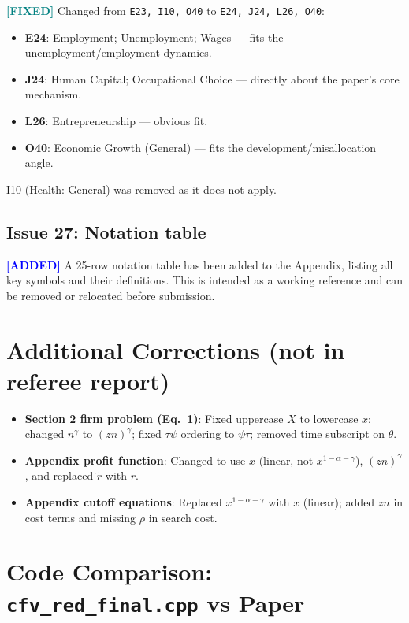 \documentclass[11pt]{article}
\newcommand{\fixed}{\textcolor{teal}{\textbf{[FIXED]}}}
\newcommand{\added}{\textcolor{blue}{\textbf{[ADDED]}}}
\begin{document}
\fixed{} Changed from \texttt{E23, I10, O40} to \texttt{E24, J24, L26, O40}:
\begin{itemize}
    \item \textbf{E24}: Employment; Unemployment; Wages --- fits the unemployment/employment dynamics.
    \item \textbf{J24}: Human Capital; Occupational Choice --- directly about the paper's core mechanism.
    \item \textbf{L26}: Entrepreneurship --- obvious fit.
    \item \textbf{O40}: Economic Growth (General) --- fits the development/misallocation angle.
\end{itemize}
I10 (Health: General) was removed as it does not apply.

\subsection*{Issue 27: Notation table}

\added{} A 25-row notation table has been added to the Appendix, listing all key symbols and their definitions. This is intended as a working reference and can be removed or relocated before submission.

\section*{Additional Corrections (not in referee report)}

\begin{itemize}
    \item \textbf{Section 2 firm problem (Eq.~1)}: Fixed uppercase $X$ to lowercase $x$; changed $n^\gamma$ to $(zn)^\gamma$; fixed $\tau\psi$ ordering to $\psi\tau$; removed time subscript on $\theta$.
    \item \textbf{Appendix profit function}: Changed to use $x$ (linear, not $x^{1-\alpha-\gamma}$), $(zn)^\gamma$, and replaced $\tilde{r}$ with $r$.
    \item \textbf{Appendix cutoff equations}: Replaced $x^{1-\alpha-\gamma}$ with $x$ (linear); added $zn$ in cost terms and missing $\rho$ in search cost.
\end{itemize}

\section*{Code Comparison: \texttt{cfv\_red\_final.cpp} vs Paper}
\end{document}
